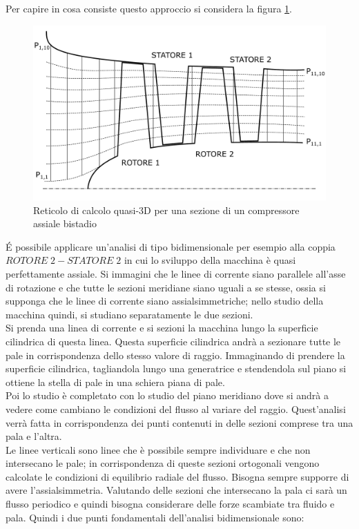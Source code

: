 Per capire in cosa consiste questo approccio si considera la figura \ref{fig:ReticoloComp1}.
\begin{figure}
\centering
  \includegraphics[width=.8\textwidth]{fig/ReticoloComp.pdf}
\caption{Reticolo di calcolo quasi-3D per una sezione di un compressore assiale bistadio}
\label{fig:ReticoloComp1}
\end{figure}
\'E possibile applicare un’analisi di tipo bidimensionale per esempio alla coppia $ROTORE\;2 - STATORE\;2$ in cui lo sviluppo della macchina è quasi perfettamente assiale. Si immagini che le linee di corrente siano parallele all'asse di rotazione e che tutte le sezioni meridiane siano uguali a se stesse, ossia si supponga che le linee di corrente siano assialsimmetriche; nello studio della macchina quindi, si studiano separatamente le due sezioni.\\
Si prenda una linea di corrente e si sezioni la macchina lungo la superficie cilindrica di questa linea. Questa superficie cilindrica andrà a sezionare tutte le pale in corrispondenza dello stesso valore di raggio. Immaginando di prendere la superficie cilindrica, tagliandola lungo una generatrice e stendendola sul piano si ottiene la stella di pale in una schiera piana di pale.\\
Poi lo studio è completato con lo studio del piano meridiano dove si andrà a vedere come cambiano le condizioni del flusso al variare del raggio. Quest'analisi verrà fatta in corrispondenza dei punti contenuti in delle sezioni comprese tra una pala e l’altra.\\
Le linee verticali sono linee che è possibile sempre individuare e che non intersecano le pale; in corrispondenza di queste sezioni ortogonali vengono calcolate le condizioni di equilibrio radiale del flusso. Bisogna sempre supporre di avere l'assialsimmetria. Valutando delle sezioni che intersecano la pala ci sarà un flusso periodico e quindi bisogna considerare delle forze scambiate tra fluido e pala. Quindi i due punti fondamentali dell'analisi bidimensionale sono:
